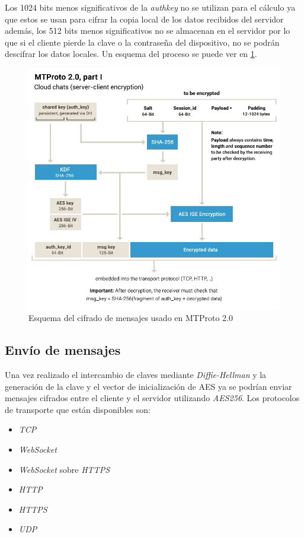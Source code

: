 Los 1024 bits menos significativos de la \emph{auth\textunderscore key} no se utilizan para el cálculo ya que estos se usan para cifrar la copia local de los datos recibidos del servidor además, los 512 bits menos significativos no se almacenan en el servidor por lo que si el cliente pierde la clave o la contraseña del dispositivo, no se podrán descifrar los datos locales. Un esquema del proceso se puede ver en \ref{mtproto2}.
\begin{figure}[htb]
	\centering
	\includegraphics[scale=0.4]{imagenes/diagramaMTProto.jpg} 
	\caption{Esquema del cifrado de mensajes usado en MTProto 2.0 \cite{WebProto}}
	\label{mtproto2}
\end{figure}

\subsection{Envío de mensajes}
Una vez realizado el intercambio de claves mediante \emph{Diffie-Hellman} y la generación de la clave y el vector de inicialización de AES ya se podrían enviar mensajes cifrados entre el cliente y el servidor utilizando \emph{AES256}.
Los protocolos de transporte que están disponibles son:
\begin{itemize}
	\item \emph{TCP}
	\item \emph{WebSocket}
	\item \emph{WebSocket} sobre \emph{HTTPS}
	\item \emph{HTTP}
	\item \emph{HTTPS}
	\item \emph{UDP}
\end{itemize}

